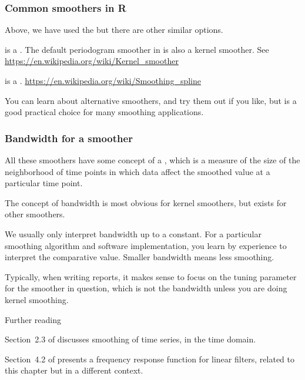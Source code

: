 \begin{frame}[fragile]

\frametitle{Common smoothers in R}

\bi

\item Above, we have used the   but there are other similar options.

\item {} is a . The default periodogram smoother in  is also a kernel smoother. See \url{https://en.wikipedia.org/wiki/Kernel_smoother}

\item {} is a .
\url{https://en.wikipedia.org/wiki/Smoothing_spline}

\item You can learn about alternative smoothers, and try them out if you like, but  is a good practical choice for many smoothing applications.

\ei
\end{frame}

\begin{frame}[fragile]
\frametitle{Bandwidth for a smoother}
\bi
\item All these smoothers have some concept of a , which is a measure of the size of the neighborhood of time points in which data affect the smoothed value at a particular time point. 

\item The concept of bandwidth is most obvious for kernel smoothers, but exists for other smoothers.

\item We usually only interpret bandwidth up to a constant. For a particular smoothing algorithm and software implementation, you learn by experience to interpret the comparative value. Smaller bandwidth means less smoothing. 

\item Typically, when writing reports, it makes sense to focus on the tuning parameter for the smoother in question, which is not the bandwidth unless you are doing kernel smoothing.

\ei
\end{frame}

\begin{frame}{Further reading} 

\bi

\item Section~2.3 of \citet{shumway17} discusses smoothing of time series, in the time domain.

\item Section~4.2 of \citet{shumway17} presents a frequency response function for linear filters, related to this chapter but in a different context.

\ei


\end{frame}


